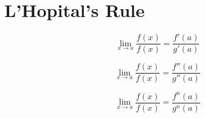 \section{L’Hopital's Rule}

\begin{equation*}
    \lim_{x \to a}\frac{f(x)}{f(x)} = \frac{f'(a)}{g'(a)}
\end{equation*}

\begin{equation*}
    \lim_{x \to a}\frac{f(x)}{f(x)} = \frac{f''(a)}{g''(a)}
\end{equation*}

\begin{equation*}
    \lim_{x \to a}\frac{f(x)}{f(x)} = \frac{f^n(a)}{g^n(a)}
\end{equation*}